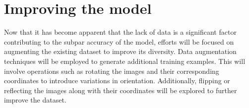 \section{Improving the model}
Now that it has become apparent that the lack of data is a significant factor contributing to the subpar accuracy of the model, efforts will be focused on augmenting the existing dataset to improve its diversity. Data augmentation techniques will be employed to generate additional training examples. This will involve operations such as rotating the images and their corresponding coordinates to introduce variations in orientation. Additionally, flipping or reflecting the images along with their coordinates will be explored to further improve the dataset. 
